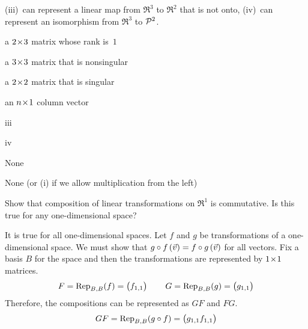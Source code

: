 \begin{exercises}
    (iii)~can represent a linear map from $\Re^3$ to $\Re^2$ that is not onto,
    (iv)~can represent an isomorphism from $\Re^3$ to $\polyspace^2$.
    \cite{Cleary}
    \begin{exparts}
      \item a $\nbym{2}{3}$ matrix whose rank is~$1$ 
      \item a $\nbyn{3}$ matrix that is nonsingular         
      \item a $\nbyn{2}$ matrix that is singular
      \item an $\nbym{n}{1}$ column vector 
    \end{exparts}
    \begin{answer}
      \begin{exparts}
        \item iii
        \item iv
        \item None
        \item None (or (i) if we allow multiplication from the left)
      \end{exparts}
    \end{answer}
  \item  
    Show that composition of linear transformations on \( \Re^1 \) is
    commutative.
    Is this true for any one-dimensional space?
    \begin{answer}
      It is true for all one-dimensional spaces.
      Let $f$ and $g$ be transformations of a one-dimensional space.
      We must show that 
      $\composed{g}{f}\,(\vec{v})=\composed{f}{g}\,(\vec{v})$
      for all vectors.
      Fix a basis $B$ for the space and then the transformations are 
      represented by $\nbyn{1}$ matrices.
      \begin{equation*}
        F=\rep{f}{B,B}=\begin{pmatrix}
                        f_{1,1}
                     \end{pmatrix}
        \qquad
        G=\rep{g}{B,B}=\begin{pmatrix}
                        g_{1,1}
                     \end{pmatrix}
      \end{equation*}
      Therefore, the compositions can be represented as $GF$ and $FG$.
      \begin{equation*}
        GF=\rep{\composed{g}{f}}{B,B}=\begin{pmatrix}
                        g_{1,1}f_{1,1}
                     \end{pmatrix}

\end{equation*}
\end{answer}
\end{exercises}
